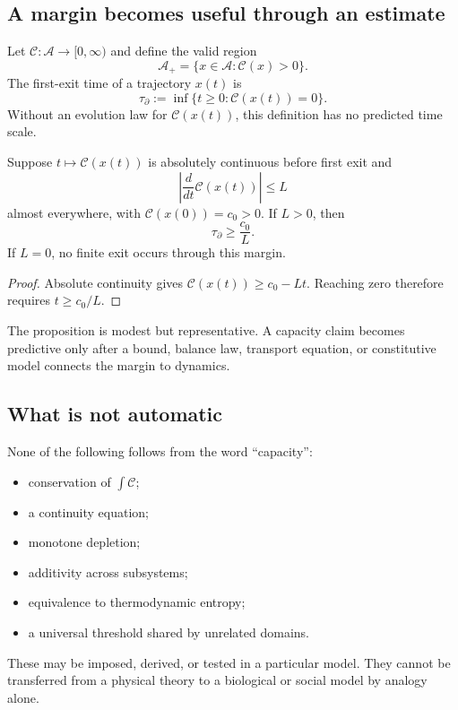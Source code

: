 \documentclass[11pt]{article}
\newcommand{\A}{\mathcal A}
\newcommand{\Ccap}{\mathcal C}
\begin{document}
\subsection{A margin becomes useful through an estimate}

Let $\Ccap:\A\to[0,\infty)$ and define the valid region
\[
  \A_+=\{x\in\A:\Ccap(x)>0\}.
\]
The first-exit time of a trajectory $x(t)$ is
\[
  \tau_\partial
  :=\inf\{t\geq0:\Ccap(x(t))=0\}.
\]
Without an evolution law for $\Ccap(x(t))$, this definition has no predicted
time scale.

\begin{proposition}\label{prop:exit}
Suppose $t\mapsto\Ccap(x(t))$ is absolutely continuous before first exit and
\[
  \left|\frac{d}{dt}\Ccap(x(t))\right|\leq L
\]
almost everywhere, with $\Ccap(x(0))=c_0>0$.  If $L>0$, then
\[
  \tau_\partial\geq\frac{c_0}{L}.
\]
If $L=0$, no finite exit occurs through this margin.
\end{proposition}

\begin{proof}
Absolute continuity gives
$\Ccap(x(t))\geq c_0-Lt$.  Reaching zero therefore requires
$t\geq c_0/L$.
\end{proof}

The proposition is modest but representative.  A capacity claim becomes
predictive only after a bound, balance law, transport equation, or
constitutive model connects the margin to dynamics.

\subsection{What is not automatic}

None of the following follows from the word ``capacity'':
\begin{itemize}
\item conservation of $\int\Ccap$;
\item a continuity equation;
\item monotone depletion;
\item additivity across subsystems;
\item equivalence to thermodynamic entropy;
\item a universal threshold shared by unrelated domains.
\end{itemize}
These may be imposed, derived, or tested in a particular model.  They cannot
be transferred from a physical theory to a biological or social model by
analogy alone.
\end{document}
